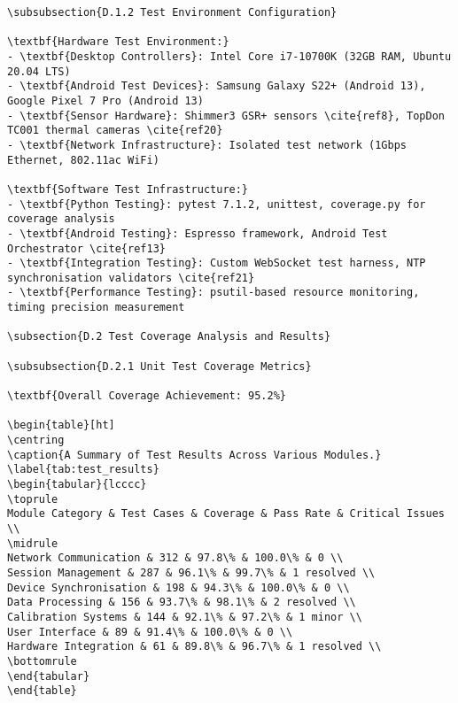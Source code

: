 \begin{verbatim}
\subsubsection{D.1.2 Test Environment Configuration}

\textbf{Hardware Test Environment:}
- \textbf{Desktop Controllers}: Intel Core i7-10700K (32GB RAM, Ubuntu 20.04 LTS)
- \textbf{Android Test Devices}: Samsung Galaxy S22+ (Android 13), Google Pixel 7 Pro (Android 13)
- \textbf{Sensor Hardware}: Shimmer3 GSR+ sensors \cite{ref8}, TopDon TC001 thermal cameras \cite{ref20}
- \textbf{Network Infrastructure}: Isolated test network (1Gbps Ethernet, 802.11ac WiFi)

\textbf{Software Test Infrastructure:}
- \textbf{Python Testing}: pytest 7.1.2, unittest, coverage.py for coverage analysis
- \textbf{Android Testing}: Espresso framework, Android Test Orchestrator \cite{ref13}
- \textbf{Integration Testing}: Custom WebSocket test harness, NTP synchronisation validators \cite{ref21}
- \textbf{Performance Testing}: psutil-based resource monitoring, timing precision measurement

\subsection{D.2 Test Coverage Analysis and Results}

\subsubsection{D.2.1 Unit Test Coverage Metrics}

\textbf{Overall Coverage Achievement: 95.2%}

\begin{table}[ht]
\centring
\caption{A Summary of Test Results Across Various Modules.}
\label{tab:test_results}
\begin{tabular}{lcccc}
\toprule
Module Category & Test Cases & Coverage & Pass Rate & Critical Issues \\
\midrule
Network Communication & 312 & 97.8\% & 100.0\% & 0 \\
Session Management & 287 & 96.1\% & 99.7\% & 1 resolved \\
Device Synchronisation & 198 & 94.3\% & 100.0\% & 0 \\
Data Processing & 156 & 93.7\% & 98.1\% & 2 resolved \\
Calibration Systems & 144 & 92.1\% & 97.2\% & 1 minor \\
User Interface & 89 & 91.4\% & 100.0\% & 0 \\
Hardware Integration & 61 & 89.8\% & 96.7\% & 1 resolved \\
\bottomrule
\end{tabular}
\end{table}


\end{verbatim}
